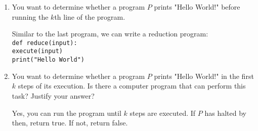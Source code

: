 \begin {enumerate}
\begin{solution}[.3 in]
\texttt{def halts(P, x):}\\
\hphantom{xyz}\texttt{def Q(x):}\\
\hphantom{xyz}\hphantom{xyz}\texttt{P(x)}\\
\hphantom{xyz}\hphantom{xyz}\texttt{print("Hello World")}\\
\hphantom{xyz}\texttt{return testHelloWorld(Q, x)}
\end{solution}
\item You want to determine whether a program $P$ prints "Hello World!" before running the $k$th line of the program.
\begin{solution}[.3 in]
Similar to the last program, we can write a reduction program:\\
\texttt{def reduce(input):}\\
\hphantom{xyz}\texttt{execute(input)}\\
\hphantom{xyz}\texttt{print("Hello World")}\\
\end{solution}
\item You want to determine whether a program $P$ prints "Hello World!" in the first $k$ steps of its execution. Is there a computer program that can perform this task? Justify your answer?\\
\begin{solution} [.1 in]
Yes, you can run the program until $k$ steps are executed. If $P$ has halted by then, return true. If not, return false.
\end{solution}
\end{enumerate}
